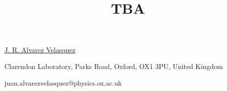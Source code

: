 \title{TBA}

\underline{J. R. Alvarez Velasquez}  

{\normalsize{\vspace{-4mm}
Clarendon Laboratory, Parks Road, Oxford, OX1 3PU, United Kingdom



\email juan.alvarezvelasquez@physics.ox.ac.uk}}



\vspace{\baselineskip}

